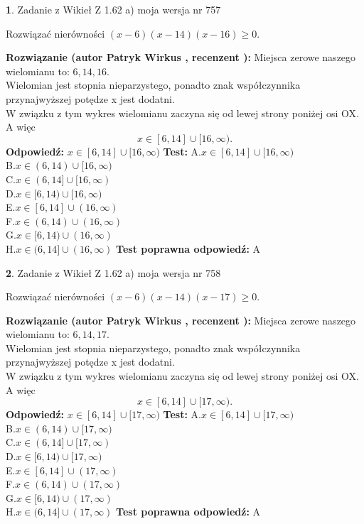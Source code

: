 \documentclass[12pt, a4paper]{article}
\theoremstyle{definition} %
\newtheorem{zad}{}
\newcommand{\zadStart}[1]{\begin{zad}#1\newline}
\newcommand{\zadStop}{\end{zad}}
\newcommand{\rozwStart}[2]{\noindent \textbf{Rozwiązanie (autor #1 , recenzent #2): }\newline}
\newcommand{\rozwStop}{\newline}
\newcommand{\odpStart}{\noindent \textbf{Odpowiedź:}\newline}
\newcommand{\odpStop}{\newline}
\newcommand{\testStart}{\noindent \textbf{Test:}\newline}
\newcommand{\testStop}{\newline}
\newcommand{\kluczStart}{\noindent \textbf{Test poprawna odpowiedź:}\newline}
\newcommand{\kluczStop}{\newline}
\begin{document}
\zadStart{Zadanie z Wikieł Z 1.62 a) moja wersja nr 757}

Rozwiązać nierówności $(x-6)(x-14)(x-16)\ge0$.
\zadStop
\rozwStart{Patryk Wirkus}{}
Miejsca zerowe naszego wielomianu to: $6, 14, 16$.\\
Wielomian jest stopnia nieparzystego, ponadto znak współczynnika przy\linebreak najwyższej potędze x jest dodatni.\\ W związku z tym wykres wielomianu zaczyna się od lewej strony poniżej osi OX. A więc $$x \in [6,14] \cup [16,\infty).$$
\rozwStop
\odpStart
$x \in [6,14] \cup [16,\infty)$
\odpStop
\testStart
A.$x \in [6,14] \cup [16,\infty)$\\
B.$x \in (6,14) \cup [16,\infty)$\\
C.$x \in (6,14] \cup [16,\infty)$\\
D.$x \in [6,14) \cup [16,\infty)$\\
E.$x \in [6,14] \cup (16,\infty)$\\
F.$x \in (6,14) \cup (16,\infty)$\\
G.$x \in [6,14) \cup (16,\infty)$\\
H.$x \in (6,14] \cup (16,\infty)$
\testStop
\kluczStart
A
\kluczStop



\zadStart{Zadanie z Wikieł Z 1.62 a) moja wersja nr 758}

Rozwiązać nierówności $(x-6)(x-14)(x-17)\ge0$.
\zadStop
\rozwStart{Patryk Wirkus}{}
Miejsca zerowe naszego wielomianu to: $6, 14, 17$.\\
Wielomian jest stopnia nieparzystego, ponadto znak współczynnika przy\linebreak najwyższej potędze x jest dodatni.\\ W związku z tym wykres wielomianu zaczyna się od lewej strony poniżej osi OX. A więc $$x \in [6,14] \cup [17,\infty).$$
\rozwStop
\odpStart
$x \in [6,14] \cup [17,\infty)$
\odpStop
\testStart
A.$x \in [6,14] \cup [17,\infty)$\\
B.$x \in (6,14) \cup [17,\infty)$\\
C.$x \in (6,14] \cup [17,\infty)$\\
D.$x \in [6,14) \cup [17,\infty)$\\
E.$x \in [6,14] \cup (17,\infty)$\\
F.$x \in (6,14) \cup (17,\infty)$\\
G.$x \in [6,14) \cup (17,\infty)$\\
H.$x \in (6,14] \cup (17,\infty)$
\testStop
\kluczStart
A
\kluczStop
\end{document}
